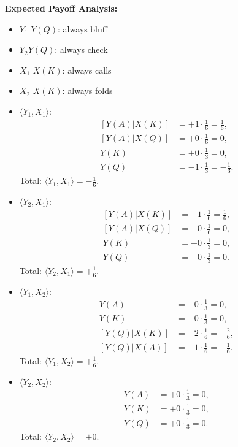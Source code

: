 \documentclass[12pt]{article}
\begin{document}
\noindent\textbf{Expected Payoff Analysis:}
\begin{itemize}
    \item \(Y_1\) $Y(Q)$: always bluff
    \item \(Y_2\)$ Y(Q)$: always check
    \item \(X_1\) $X(K)$: always calls
    \item \(X_2\) $X(K)$: always folds
\end{itemize}


\begin{itemize}
    \item \(\langle Y_1, X_1 \rangle\):  
    \[
    \begin{aligned}
    [Y(A)|X(K)] &= +1 \cdot \frac{1}{6} = \frac{1}{6}, \\
    [Y(A)|X(Q)] &= +0 \cdot \frac{1}{6} = 0, \\
    Y(K) &= +0 \cdot \frac{1}{3} = 0, \\
    Y(Q) &= -1 \cdot \frac{1}{3} = -\frac{1}{3}.
    \end{aligned}
    \]
    Total: \(\langle Y_1, X_1 \rangle = -\frac{1}{6}\).

    \item \(\langle Y_2, X_1 \rangle\):  
    \[
    \begin{aligned}
    [Y(A)|X(K)] &= +1 \cdot \frac{1}{6} = \frac{1}{6}, \\
    [Y(A)|X(Q)] &= +0 \cdot \frac{1}{6} = 0, \\
    Y(K) &= +0 \cdot \frac{1}{3} = 0, \\
    Y(Q) &= +0 \cdot \frac{1}{3} = 0.
    \end{aligned}
    \]
    Total: \(\langle Y_2, X_1 \rangle = +\frac{1}{6}\).
    
    \item \(\langle Y_1, X_2 \rangle\):  
    \[
    \begin{aligned}
    Y(A) &= +0 \cdot \frac{1}{3} = 0, \\
    Y(K) &= +0 \cdot \frac{1}{3} = 0, \\
    [Y(Q)|X(K)] &= +2 \cdot \frac{1}{6} = +\frac{2}{6}, \\
    [Y(Q)|X(A)] &= -1 \cdot \frac{1}{6} = -\frac{1}{6}.
    \end{aligned}
    \]
    Total: \(\langle Y_1, X_2 \rangle = +\frac{1}{6}\).

    \item \(\langle Y_2, X_2 \rangle\):  
    \[
    \begin{aligned}
    Y(A) &= +0 \cdot \frac{1}{3} = 0, \\
    Y(K) &= +0 \cdot \frac{1}{3} = 0, \\
    Y(Q) &= +0 \cdot \frac{1}{3} = 0.
    \end{aligned}
    \]
    Total: \(\langle Y_2, X_2 \rangle = +0\).
\end{itemize}
\end{document}
